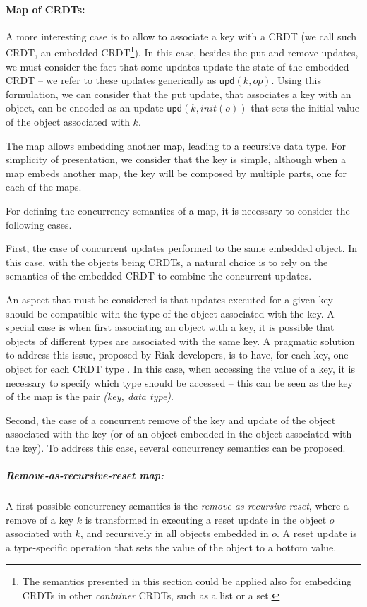 \documentclass[11pt,a4paper]{article}
\begin{document}
\paragraph{Map of CRDTs:}
A more interesting case is to allow to associate a key with a CRDT
(we call such CRDT, an embedded CRDT\footnote{The semantics presented in 
this section could be applied also for embedding CRDTs in other \emph{container} 
CRDTs, such as a list or a set.}).
In this case, besides the put and remove updates, we must consider the fact
that some updates update the state of the embedded CRDT -- we refer
to these updates generically as $\mathsf{upd}(k,op)$. 
Using this formulation, we can consider that the put update, that associates a key
with an object, can be encoded as an update $\mathsf{upd}(k,init(o))$
that sets the initial value of the object associated with $k$.

The map allows embedding another map, leading to a recursive data type.
For simplicity of presentation, we consider 
that the key is simple, although when a map embeds another map, the 
key will be composed by multiple parts, one for each of the maps.

For defining the concurrency semantics of a map, it is necessary to consider 
the following cases.

First, the case of concurrent updates performed to the same embedded
object. In this case, with the objects being CRDTs, a natural choice is 
to rely on the semantics of the embedded CRDT to combine the 
concurrent updates.

An aspect that must be considered is that updates executed for a given key
should be compatible with the type of the object associated with the key.
A special case is when first associating an object with a key, it is possible
that objects of different types are associated with the same key.
A pragmatic solution to address this issue, proposed by Riak developers,
is to have, for each key, one object for each CRDT type \cite{Brown14Riak}.
In this case, when accessing the value of a key, it is necessary to specify 
which type should be accessed -- this can be seen as the key of the 
map is the pair \emph{(key, data type)}.

Second, the case of a concurrent remove of the key and update of the object 
associated with the key (or of an object embedded in the object associated
with the key).
To address this case, several concurrency semantics can be proposed.

\subparagraph{Remove-as-recursive-reset map:}
A first possible concurrency semantics is the \emph{remove-as-recursive-reset}, where 
a remove of a key $k$ is transformed in executing a reset update 
in the object $o$ associated with $k$, and recursively in all objects 
embedded in $o$. 
A reset update is a type-specific operation that sets the value of the
object to a bottom value.
\end{document}
